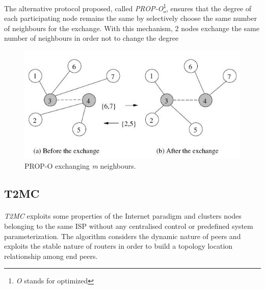 \documentclass[a4paper,10pt]{article}
\begin{document}
The alternative protocol proposed, called \emph{PROP-O}\footnote{\emph{O} stands for optimized}, ensures that the degree of each participating node remains the same by selectively choose the same number of neighbours for the exchange. With this mechanism, 2 nodes exchange the same number of neighbours in order not to change the degree

\begin{figure}
\centering
  \includegraphics[scale=0.4]{img/prop-o.jpeg}
\caption{PROP-O exchanging \emph{m} neighbours.}
\label{figure:prop-o}
\end{figure}

\subsection{T2MC}

\paragraph{}
\emph{T2MC}\cite{shi_t2mc_2008} exploits some properties of the Internet paradigm and clusters nodes belonging to the same ISP without any centralised control or predefined system parameterization. The algorithm considers the dynamic nature of peers and exploits the stable nature of routers in order to build a topology location relationship among end peers.
\end{document}
